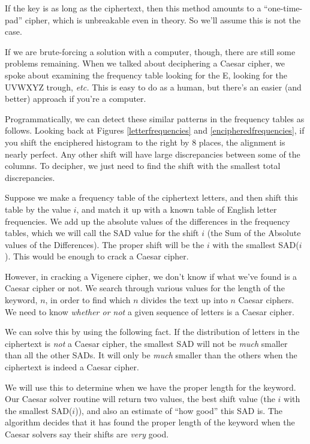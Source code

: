 \documentclass{article}
\begin{document}
\begin{description}
  If the key is as long as the ciphertext, then this method amounts to
  a ``one-time-pad'' cipher, which is unbreakable even in theory.  So
  we'll assume this is not the case.

If we are brute-forcing a solution with a computer, though, there are
still some problems remaining.  When we talked about deciphering a
Caesar cipher, we spoke about examining the frequency table looking
for the E, looking for the UVWXYZ trough, {\em etc.}  This is easy to
do as a human, but there's an easier (and better) approach if you're a
computer.

Programmatically, we can detect these similar patterns in the
frequency tables as follows.  Looking back at Figures
\ref{letterfrequencies} and \ref{encipheredfrequencies}, if you shift
the enciphered histogram to the right by 8 places, the alignment is
nearly perfect.  Any other shift will have large discrepancies between
some of the columns.  To decipher, we just need to find the shift with
the smallest total discrepancies.

Suppose we make a frequency table of the ciphertext letters, and then
shift this table by the value $i$, and match it up with a known table
of English letter frequencies.  We add up the absolute values of the
differences in the frequency tables, which we will call the SAD value
for the shift $i$ (the Sum of the Absolute values of the Differences).
The proper shift will be the $i$ with the smallest SAD($i$).  This
would be enough to crack a Caesar cipher.

However, in cracking a Vigenere cipher, we don't know if what we've
found is a Caesar cipher or not.  We search through various values for
the length of the keyword, $n$, in order to find which $n$ divides the
text up into $n$ Caesar ciphers.  We need to know {\em whether or not}
a given sequence of letters is a Caesar cipher.

We can solve this by using the following fact.
If the distribution of letters in the ciphertext is {\em not} a Caesar
cipher, the smallest SAD will not be {\em much} smaller than all the
other SADs.  It will only be {\em much} smaller than the others when
the ciphertext is indeed a Caesar cipher.

We will use this to determine when we have the proper length for the
keyword.  Our Caesar solver routine will return two values, the best
shift value (the $i$ with the smallest SAD($i$)), and also an estimate
of ``how good'' this SAD is.  The algorithm decides that it has found
the proper length of the keyword when the Caesar solvers say their
shifts are {\em very} good.


\end{description}
\end{document}
